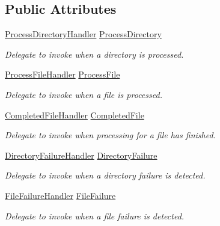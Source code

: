 \subsection*{Public Attributes}
\begin{DoxyCompactItemize}
\item 
\hyperlink{namespace_i_c_sharp_code_1_1_sharp_zip_lib_1_1_core_a37bb92cd3528127a005ef2ca4dd478f5}{Process\+Directory\+Handler} \hyperlink{class_i_c_sharp_code_1_1_sharp_zip_lib_1_1_core_1_1_file_system_scanner_abc556d005a5f1fd888cd5505d8e1bb3b}{Process\+Directory}
\begin{DoxyCompactList}\small\item\em Delegate to invoke when a directory is processed. \end{DoxyCompactList}\item 
\hyperlink{namespace_i_c_sharp_code_1_1_sharp_zip_lib_1_1_core_abba22d663b2d9f4fa4bda2dc2e867bb4}{Process\+File\+Handler} \hyperlink{class_i_c_sharp_code_1_1_sharp_zip_lib_1_1_core_1_1_file_system_scanner_a7a9c09fd30a1dff0384a98b84a8e2723}{Process\+File}
\begin{DoxyCompactList}\small\item\em Delegate to invoke when a file is processed. \end{DoxyCompactList}\item 
\hyperlink{namespace_i_c_sharp_code_1_1_sharp_zip_lib_1_1_core_aecab27a02c97037c68a78142fbbdc069}{Completed\+File\+Handler} \hyperlink{class_i_c_sharp_code_1_1_sharp_zip_lib_1_1_core_1_1_file_system_scanner_acb95580107bb56e250c9a17272660204}{Completed\+File}
\begin{DoxyCompactList}\small\item\em Delegate to invoke when processing for a file has finished. \end{DoxyCompactList}\item 
\hyperlink{namespace_i_c_sharp_code_1_1_sharp_zip_lib_1_1_core_a59ce8afe31b0ed5684e54008b1c8dd33}{Directory\+Failure\+Handler} \hyperlink{class_i_c_sharp_code_1_1_sharp_zip_lib_1_1_core_1_1_file_system_scanner_a25a0c2b16ec9583b9bb4bd2e6bbb4f02}{Directory\+Failure}
\begin{DoxyCompactList}\small\item\em Delegate to invoke when a directory failure is detected. \end{DoxyCompactList}\item 
\hyperlink{namespace_i_c_sharp_code_1_1_sharp_zip_lib_1_1_core_a956b875da234d5808c4151b3ac822f80}{File\+Failure\+Handler} \hyperlink{class_i_c_sharp_code_1_1_sharp_zip_lib_1_1_core_1_1_file_system_scanner_a4a2920d13e51dc762aff6e461dc8812f}{File\+Failure}
\begin{DoxyCompactList}\small\item\em Delegate to invoke when a file failure is detected. \end{DoxyCompactList}\end{DoxyCompactItemize}


